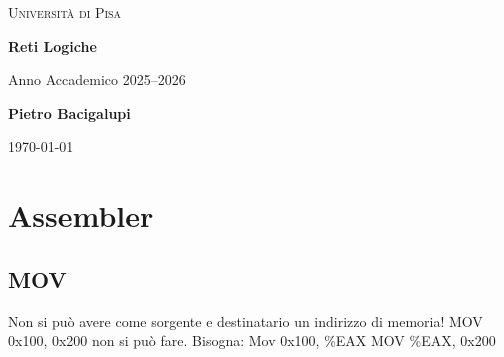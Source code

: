 \documentclass[a4paper,12pt]{article}
\begin{document}
	
	\begin{titlepage}
		\centering
		
		{\scshape\LARGE Università di Pisa \par}
		\vspace{0.5cm}
		
		{\Huge\bfseries Reti Logiche \par}
		\vspace{0.5cm}
		{\Large Anno Accademico 2025--2026 \par}
		
		\vfill
		
		{\Large\textbf{Pietro Bacigalupi} \par}
		\vspace{0.5cm}
		
		\vfill
		
		{\large \today\par}
		
	\end{titlepage}
	
	\tableofcontents
	\newpage
	\section{Assembler}
	\subsection{MOV}
	Non si può avere come sorgente e destinatario un indirizzo di memoria! 
	MOV 0x100, 0x200 non si può fare. Bisogna:
	Mov 0x100, \%EAX
	MOV \%EAX, 0x200
\end{document}
